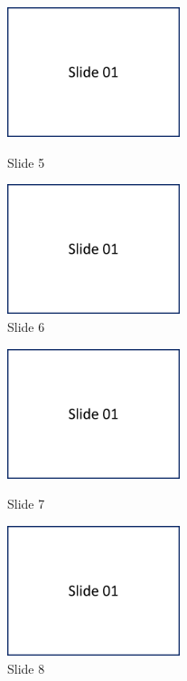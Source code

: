\begin{figure}[H]
\parbox{74.mm}{
    \centering
    \includegraphics[width=0.45\textwidth,page=5]{resources/PresentationSlides}
    \caption*{Slide 5}
}
    \parbox{74.mm}{
    \centering
    \includegraphics[width=0.45\textwidth,page=6]{resources/PresentationSlides}
    \caption*{Slide 6}
}
\end{figure}

\begin{figure}[H]
\parbox{74.mm}{
    \centering
    \includegraphics[width=0.45\textwidth,page=7]{resources/PresentationSlides}
    \caption*{Slide 7}
}
    \parbox{74.mm}{
    \centering
    \includegraphics[width=0.45\textwidth,page=8]{resources/PresentationSlides}
    \caption*{Slide 8}
}
\end{figure}

